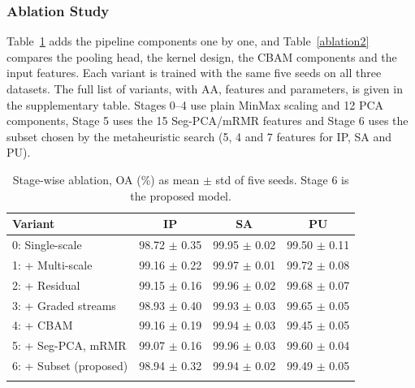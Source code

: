 \documentclass[conference]{IEEEtran}
\begin{document}
	\subsubsection{Ablation Study}
	Table~\ref{ablation} adds the pipeline components one by one, and Table~\ref{ablation2} compares the pooling head, the kernel design, the CBAM components and the input features. Each variant is trained with the same five seeds on all three datasets. The full list of variants, with AA, features and parameters, is given in the supplementary table. Stages 0--4 use plain MinMax scaling and 12 PCA components, Stage 5 uses the 15 Seg-PCA/mRMR features and Stage 6 uses the subset chosen by the metaheuristic search (5, 4 and 7 features for IP, SA and PU).
	
	\begin{table}[t]
		\centering
		\caption{Stage-wise ablation, OA (\%) as mean $\pm$ std of five seeds. Stage 6 is the proposed model.}
		\label{ablation}
		\renewcommand*\arraystretch{1.05}
		\footnotesize
		\setlength{\tabcolsep}{1.8pt}
		\begin{tabular}{@{}lccc@{}}
			\toprule
			Variant & IP & SA & PU \\ \midrule
			0: Single-scale & 98.72 $\pm$ 0.35 & 99.95 $\pm$ 0.02 & 99.50 $\pm$ 0.11 \\
			1: + Multi-scale & 99.16 $\pm$ 0.22 & 99.97 $\pm$ 0.01 & 99.72 $\pm$ 0.08 \\
			2: + Residual & 99.15 $\pm$ 0.16 & 99.96 $\pm$ 0.02 & 99.68 $\pm$ 0.07 \\
			3: + Graded streams & 98.93 $\pm$ 0.40 & 99.93 $\pm$ 0.03 & 99.65 $\pm$ 0.05 \\
			4: + CBAM & 99.16 $\pm$ 0.19 & 99.94 $\pm$ 0.03 & 99.45 $\pm$ 0.05 \\
			5: + Seg-PCA, mRMR & 99.07 $\pm$ 0.16 & 99.96 $\pm$ 0.03 & 99.60 $\pm$ 0.04 \\
			6: + Subset (proposed) & 98.94 $\pm$ 0.32 & 99.94 $\pm$ 0.02 & 99.49 $\pm$ 0.05 \\ \\ \bottomrule
		\end{tabular}
	\end{table}
	
\end{document}
